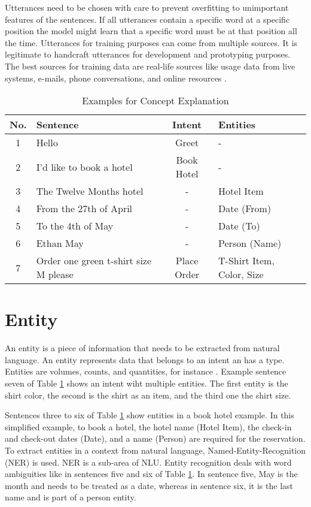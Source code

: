 Utterances need to be chosen with care to prevent overfitting to unimportant features of the sentences.
If all utterances contain a specific word at a specific position the model 
might learn that a specific word must be at that position all the time.
Utterances for training purposes can come from multiple sources.
It is legitimate to handcraft utterances for development and prototyping purposes.
The best sources for training data are real-life sources like usage data from live systems, e-mails, phone conversations, and online resources \cite{singhbuilding}.    


\begin{table}[H]
    \centering
    \begin{tabular}{ c | l | c | l }
        No. & Sentence & Intent & Entities \\ \hline \hline
        1 & Hello & Greet & - \\ \hline
        2 & I'd like to book a hotel & Book Hotel & - \\ \hline
        3 & The Twelve Months hotel & - & Hotel Item\\ \hline
        4 & From the 27th of April & - & Date (From)\\ \hline
        5 & To the 4th of May & - & Date (To)\\ \hline
        6 & Ethan May & - & Person (Name)\\ \hline
        7 & Order one green t-shirt size M please & Place Order & T-Shirt Item, Color, Size \\ \hline
    \end{tabular}
    \caption{Examples for Concept Explanation} \label{tab:example_sentences}
\end{table} \noindent

\section{Entity} \label{sec:entity}
An entity is a piece of information that needs to be extracted from natural language.
An entity represents data that belongs to an intent an has a type.
Entities are volumes, counts, and quantities, for instance \cite{buiildChatbotsPython}.
Example sentence seven of Table \ref{tab:example_sentences} shows an intent wiht multiple entities.
The first entity is the shirt color,  the second is the shirt as an item, and the third one the shirt size.

Sentences three to six of Table \ref{tab:example_sentences} show entities in a book hotel example.
In this simplified example, to book a hotel, the hotel name (Hotel Item), the check-in and check-out dates (Date), and a name (Person) are required for the reservation.
To extract entities in a context from natural language, Named-Entity-Recognition (NER) is used.
NER is a sub-area of NLU.
Entity recognition deals with word ambiguities like in sentences five and six of Table \ref{tab:example_sentences}.
In sentence five, May is the month and needs to be treated as a date, whereas in sentence six, it is the last name and is part of a person entity.

